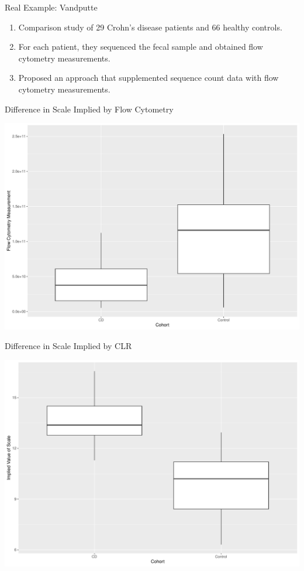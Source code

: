 \documentclass[
  ignorenonframetext,
]{beamer}
\begin{document}
\begin{frame}{Real Example: Vandputte}
\protect\hypertarget{real-example-vandputte}{}
\begin{enumerate}
\item
  Comparison study of 29 Crohn's disease patients and 66 healthy
  controls.
\item
  For each patient, they sequenced the fecal sample and obtained flow
  cytometry measurements.
\item
  Proposed an approach that supplemented sequence count data with flow
  cytometry measurements.
\end{enumerate}
\end{frame}

\begin{frame}{Difference in Scale Implied by Flow Cytometry}
\protect\hypertarget{difference-in-scale-implied-by-flow-cytometry}{}
\begin{center}\includegraphics[width=0.95\linewidth]{slides_files/figure-beamer/unnamed-chunk-11-1} \end{center}
\end{frame}

\begin{frame}{Difference in Scale Implied by CLR}
\protect\hypertarget{difference-in-scale-implied-by-clr}{}
\begin{center}\includegraphics[width=0.95\linewidth]{slides_files/figure-beamer/unnamed-chunk-12-1} \end{center}
\end{frame}
\end{document}
